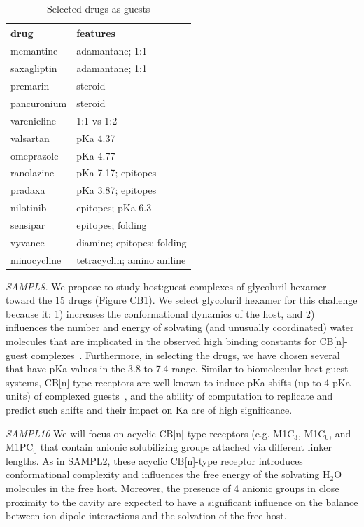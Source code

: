 \documentclass[11pt]{article}
\begin{document}
\begin{table}
\begin{tabular}{l | l}
{\bf drug} & {\bf features} \\
\hline
memantine & adamantane; 1:1 \\
saxagliptin & adamantane; 1:1 \\
premarin & steroid \\
pancuronium & steroid\\
varenicline & 1:1 vs 1:2 \\
valsartan & pKa 4.37 \\ 
omeprazole & pKa 4.77 \\
ranolazine & pKa 7.17; epitopes \\
pradaxa & pKa 3.87; epitopes \\
nilotinib & epitopes; pKa 6.3 \\
sensipar & epitopes; folding \\
vyvance & diamine; epitopes; folding \\
minocycline & tetracyclin; amino aniline \\
\end{tabular}
\caption{\label{table:CB} Selected drugs as guests }
\end{table}

\emph{SAMPL8.} We propose to study host:guest complexes of glycoluril hexamer toward the 15 drugs (Figure CB1).  We select glycoluril hexamer for this challenge because it: 1) increases the conformational dynamics of the host, and 2) influences the number and energy of solvating (and unusually coordinated) water molecules that are implicated in the observed high binding constants for CB[n]-guest complexes~\cite{biedermann_release_2012, biedermann_hydrophobic_2014}.  Furthermore, in selecting the drugs, we have chosen several that have pKa values in the 3.8 to 7.4 range.  Similar to biomolecular host-guest systems, CB[n]-type receptors are well known to induce pKa shifts (up to 4 pKa units) of complexed guests~\cite{saleh_activation_2008, nau_deep_2011, ghosh_strategic_2012}, and the ability of computation to replicate and predict such shifts and their impact on Ka are of high significance.
 
\emph{SAMPL10} We will focus on acyclic CB[n]-type receptors (e.g. M1C$_3$, M1C$_0$, and M1PC$_0$ that contain anionic solubilizing groups attached via different linker lengths.  As in SAMPL2, these acyclic CB[n]-type receptor introduces conformational complexity and influences the free energy of the solvating H$_2$O molecules in the free host.  Moreover, the presence of 4 anionic groups in close proximity to the cavity are expected to have a significant influence on the balance between ion-dipole interactions and the solvation of the free host.
\end{document}
